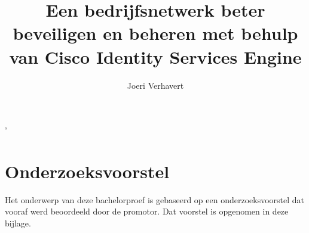 \documentclass{bachproef-tin}
\title{Een bedrijfsnetwerk beter beveiligen en beheren met behulp van Cisco Identity Services Engine}
\author{Joeri Verhavert}
\begin{document}
\inserttitlepage




\pagestyle{empty} %
\tableofcontents  %
\cleardoublepage  %
\pagestyle{fancy} %



\listoffigures
\listoftables







'

\appendix
\renewcommand{\chaptername}{Appendix}


\chapter{Onderzoeksvoorstel}

Het onderwerp van deze bachelorproef is gebaseerd op een onderzoeksvoorstel dat vooraf werd beoordeeld door de promotor. Dat voorstel is opgenomen in deze bijlage.






\printbibliography[heading=bibintoc]
\end{document}
